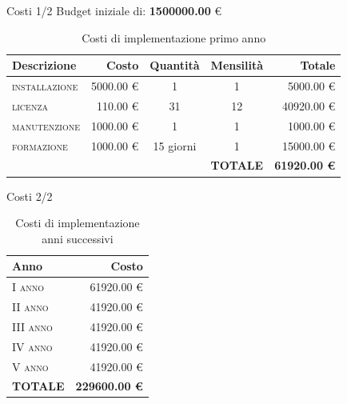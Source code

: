 \begin{frame}{Costi \small{1/2}}
Budget iniziale di: \textbf{1500000.00} \euro{}
\begin{table}
\begin{tabular}{ l | r | c | c | r }
\textbf{Descrizione} & \textbf{Costo} & \textbf{Quantità} & \textbf{Mensilità} & \textbf{Totale}\\
\hline
\hline
\textsc{installazione} & 5000.00 \euro{} & 1 & 1 & 5000.00 \euro{}\\
\textsc{licenza} & 110.00 \euro{} & 31 & 12 & 40920.00 \euro{}\\
\textsc{manutenzione} & 1000.00 \euro{} & 1 & 1 & 1000.00 \euro{}\\
\textsc{formazione} & 1000.00 \euro{} & 15 giorni & 1 & 15000.00 \euro{}\\
& & & \textbf{TOTALE} & \textbf{61920.00 \euro{}}\\
\end{tabular}
\caption{Costi di implementazione primo anno}
\end{table}
\end{frame}

\begin{frame}{Costi \small{2/2}}
\begin{table}
\begin{tabular}{ l | r  }
\textbf{Anno} & \textbf{Costo}\\
\hline
\hline
\textsc{I anno} & 61920.00 \euro{}\\
\textsc{II anno} & 41920.00 \euro{}\\
\textsc{III anno} & 41920.00 \euro{}\\
\textsc{IV anno} & 41920.00 \euro{}\\
\textsc{V anno} & 41920.00 \euro{}\\
\textbf{TOTALE} & \textbf{229600.00 \euro{}}\\
\end{tabular}
\caption{Costi di implementazione anni successivi}
\end{table}
\end{frame}

